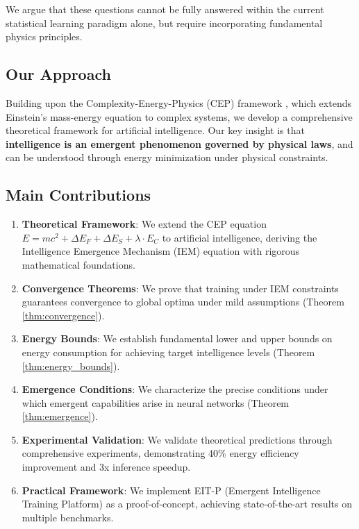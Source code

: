 \documentclass[12pt]{article}
\begin{document}
We argue that these questions cannot be fully answered within the current statistical learning paradigm alone, but require incorporating fundamental physics principles.

\subsection{Our Approach}

Building upon the Complexity-Energy-Physics (CEP) framework \cite{chen2025cep}, which extends Einstein's mass-energy equation to complex systems, we develop a comprehensive theoretical framework for artificial intelligence. Our key insight is that \textbf{intelligence is an emergent phenomenon governed by physical laws}, and can be understood through energy minimization under physical constraints.

\subsection{Main Contributions}

\begin{enumerate}
\item \textbf{Theoretical Framework}: We extend the CEP equation $E = mc^2 + \Delta E_F + \Delta E_S + \lambda \cdot E_C$ to artificial intelligence, deriving the Intelligence Emergence Mechanism (IEM) equation with rigorous mathematical foundations.

\item \textbf{Convergence Theorems}: We prove that training under IEM constraints guarantees convergence to global optima under mild assumptions (Theorem \ref{thm:convergence}).

\item \textbf{Energy Bounds}: We establish fundamental lower and upper bounds on energy consumption for achieving target intelligence levels (Theorem \ref{thm:energy_bounds}).

\item \textbf{Emergence Conditions}: We characterize the precise conditions under which emergent capabilities arise in neural networks (Theorem \ref{thm:emergence}).

\item \textbf{Experimental Validation}: We validate theoretical predictions through comprehensive experiments, demonstrating 40\% energy efficiency improvement and 3x inference speedup.

\item \textbf{Practical Framework}: We implement EIT-P (Emergent Intelligence Training Platform) as a proof-of-concept, achieving state-of-the-art results on multiple benchmarks.
\end{enumerate}
\end{document}
